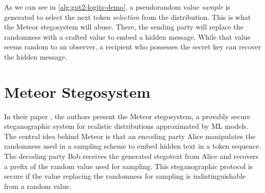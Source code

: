 As we can see in \autoref{alg:gpt2-logits-demo}, a pseudorandom value \emph{sample} is generated to select the next token \emph{selection} from the distribution.
This is what the Meteor stegosystem will abuse.
There, the sending party will replace the randomness with a crafted value to embed a hidden message.
While that value seems random to an observer, a recipient who possesses the secret key can recover the hidden message.

\newpage





\newpage

\section{Meteor Stegosystem}
\label{sec:meteor}
In their paper \cite{Meteor2021}, the authors present the Meteor stegosystem, a provably secure steganographic system for realistic distributions approximated by ML models.
The central idea behind Meteor is that an encoding party Alice manipulates the randomness used in a sampling scheme to embed hidden text in a token sequence.
The decoding party Bob receives the generated stegotext from Alice and recovers a prefix of the random value used for sampling.
This steganographic protocol is secure if the value replacing the randomness for sampling is indistinguishable from a random value.

